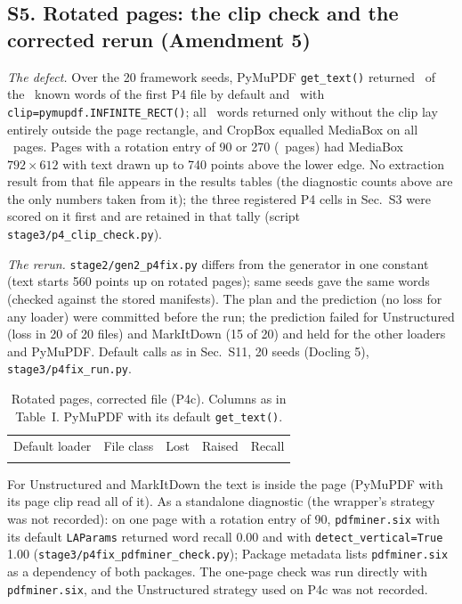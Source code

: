 \subsection*{S5. Rotated pages: the clip check and the corrected rerun (Amendment 5)}
\emph{The defect.} Over the 20 framework seeds, PyMuPDF \texttt{get\_text()} returned \pFourDefault\ of the \pFourWords\ known words of the first P4 file by default and \pFourNoClip\ with \texttt{clip=pymupdf.INFINITE\_RECT()}; all \pFourExtra\ words returned only without the clip lay entirely outside the page rectangle, and CropBox equalled MediaBox on all \pFourPages\ pages. Pages with a rotation entry of 90 or 270 (\pFourNinety\ pages) had MediaBox $792\times612$ with text drawn up to 740 points above the lower edge. No extraction result from that file appears in the results tables (the diagnostic counts above are the only numbers taken from it); the three registered P4 cells in Sec.~S3 were scored on it first and are retained in that tally (script \texttt{stage3/p4\_clip\_check.py}).

\emph{The rerun.} \texttt{stage2/gen2\_p4fix.py} differs from the generator in one constant (text starts 560 points up on rotated pages); same seeds gave the same words (checked against the stored manifests). The plan and the prediction (no loss for any loader) were committed before the run; the prediction failed for Unstructured (loss in 20 of 20 files) and MarkItDown (15 of 20) and held for the other loaders and PyMuPDF. Default calls as in Sec.~S11, 20 seeds (Docling 5), \texttt{stage3/p4fix\_run.py}.
\begin{table}[H]
\caption{Rotated pages, corrected file (P4c). Columns as in Table~I. PyMuPDF with its default \texttt{get\_text()}.\label{tab:pfour}}
\footnotesize
\begin{ruledtabular}
\begin{tabular}{llccc}
Default loader & File class & Lost & Raised & Recall \\
\colrule

\end{tabular}
\end{ruledtabular}
\end{table}
For Unstructured and MarkItDown the text is inside the page (PyMuPDF with its page clip read all of it). As a standalone diagnostic (the wrapper's strategy was not recorded): on one page with a rotation entry of 90, \texttt{pdfminer.six} with its default \texttt{LAParams} returned word recall 0.00 and with \texttt{detect\_vertical=True} 1.00 (\texttt{stage3/p4fix\_pdfminer\_check.py}); Package metadata lists \texttt{pdfminer.six} as a dependency of both packages. The one-page check was run directly with \texttt{pdfminer.six}, and the Unstructured strategy used on P4c was not recorded.

